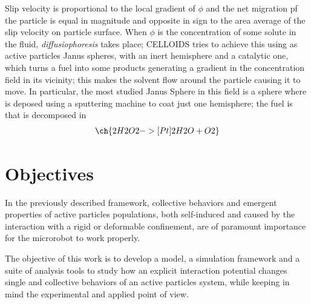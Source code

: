 \documentclass[../../master_thesis_np.tex]{subfiles}
\begin{document}
	Slip velocity is proportional to the local gradient of $\phi$ and the net migration pf the particle is equal in magnitude and opposite in sign to the area average of the slip velocity on particle surface.
	When $\phi$ is the concentration of some solute in the fluid, \emph{diffusiophoresis} takes place; CELLOIDS tries to achieve this using as active particles Janus spheres, with an inert hemisphere and a catalytic one, which turns a fuel into some products generating a gradient in the concentration field in its vicinity; this makes the solvent flow around the particle causing it to move. 
	In particular, the most studied Janus Sphere in this field is a  sphere where  is deposed using a sputtering machine to coat just one hemisphere; the fuel is  that is decomposed in 
	\begin{align}
	\ch{2 H2O2 ->[Pt] 2 H2O + O2}
	\end{align}
	
	\section{Objectives}	
	In the previously described framework, collective behaviors and emergent properties of active particles populations, both self-induced and caused by the interaction with a rigid or deformable confinement, are of paramount importance for the microrobot to work properly. 
	
	The objective of this work is to develop a model, a simulation framework and a suite of analysis tools to study how an explicit interaction potential changes single and collective behaviors of an active particles system, while keeping in mind the experimental and applied point of view. 
	
\end{document}

